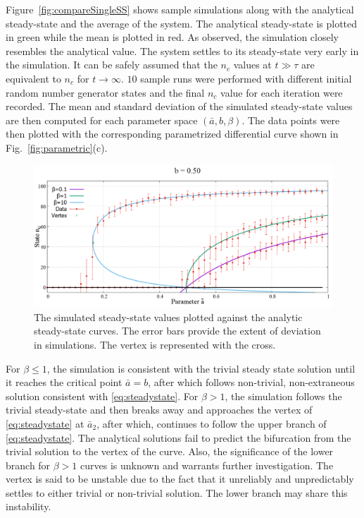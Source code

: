 Figure~\ref{fig:compareSingleSS} shows sample simulations along with the analytical steady-state and the average of the system.
The analytical steady-state is plotted in green while the mean is plotted in red.
As observed, the simulation closely resembles the analytical value. The system settles to its steady-state very early in the simulation.
It can be safely assumed that the $n_{c}$ values at $t \gg \tau$ are equivalent to $n_{c}$ for $t \rightarrow \infty$.
$10$ sample runs were performed with different initial random number generator states and the final $n_{c}$ value for each iteration were recorded.
The mean and standard deviation of the simulated steady-state values are then computed for each parameter space $(\bar{a},b,\beta)$. 
The data points were then plotted with the corresponding parametrized differential curve shown in Fig.~\ref{fig:parametric}(c).

\begin{figure}
 \centering
  \includegraphics[width=\linewidth]{images/chapter3/phase+sim.png}
  \caption{The simulated steady-state values plotted against the analytic steady-state curves. The error bars provide the extent of deviation in simulations. The vertex is represented with the cross.}
  \label{fig:phase+sim}
\end{figure}

For $\beta \leq 1$, the simulation is consistent with the trivial steady state solution until it reaches the critical point $\bar{a} = b$, after which follows non-trivial, non-extraneous solution consistent with \eqref{eq:steadystate}.
For $\beta > 1$, the simulation follows the trivial steady-state and then breaks away and approaches the vertex of \eqref{eq:steadystate} at $\bar{a}_{2}$, after which, continues to follow the upper branch of \eqref{eq:steadystate}.
The analytical solutions fail to predict the bifurcation from the trivial solution to the vertex of the curve.
Also, the significance of the lower branch for $\beta > 1$ curves is unknown and warrants further investigation.
The vertex is said to be unstable due to the fact that it unreliably and unpredictably settles to either trivial or non-trivial solution.
The lower branch may share this instability.    

